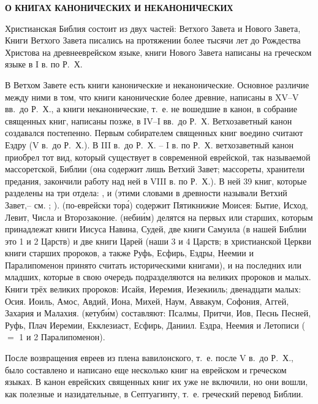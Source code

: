 \thispagestyle{empty}
\begin{center}
\normalsize\bfseries
О КНИГАХ КАНОНИЧЕСКИХ И НЕКАНОНИЧЕСКИХ
\end{center}

Христианская Библия состоит из двух частей: Ветхого Завета и Нового Завета,
Книги Ветхого Завета писались на протяжении более тысячи лет до Рождества
Христова на древнееврейском языке, книги Нового Завета написаны на греческом
языке в I в. по Р.~Х.

В Ветхом Завете есть книги канонические и неканонические.
Основное различие между ними в том, что книги канонические более древние,
написаны в XV--V вв.~до Р.~Х., а книги неканонические, т.~е. не вошедшие в
канон, в собрание священных книг, написаны позже, в IV--I вв.~до Р.~Х.
Ветхозаветный канон создавался постепенно.
Первым собирателем священных книг воедино считают Ездру (V в.~до Р.~Х.).
В III в.~до Р.~Х. -- I в. по Р.~Х. ветхозаветный канон приобрел тот вид,
который существует в современной еврейской, так называемой массоретской,
Библии (она содержит лишь Ветхий Завет; массореты, хранители предания,
закончили работу над ней в VIII в. по Р.~Х.).
В ней 39 книг, которые разделены на три отдела: ,
 и  (этими словами в древности называли
Ветхий Завет,-- см. ; ).
 (по-еврейски тор\'а) содержит Пятикнижие Моисея: Бытие, Исход, Левит,
Числа и Второзаконие.
 (неби\'им) делятся на первых или старших, которым принадлежат книги
Иисуса Навина, Судей, две книги Самуила (в нашей Библии это 1 и 2 Царств) и
две книги Царей (наши 3 и 4 Царств; в христианской Церкви книги старших
пророков, а также Руфь, Есфирь, Ездры, Неемии и Паралипоменон принято
считать историческими книгами), и на последних или младших, которые в
свою очередь подразделяются на великих пророков и малых.
Книги трёх великих пророков: Исайя, Иеремия, Иезекииль;
двенадцати малых: Осия.  Иоиль, Амос, Авдий, Иона, Михей, Наум, Аввакум,
Софония, Аггей, Захария и Малахия.
 (кетуб\'им) составляют: Псалмы, Притчи, Иов, Песнь Песней, Руфь,
Плач Иеремии, Екклезиаст, Есфирь, Даниил. Ездра, Неемия и Летописи
($=$ 1 и 2 Паралипоменон).

После возвращения евреев из плена вавилонского, т.~е. после V в.~до Р.~Х.,
было составлено и написано еще несколько книг на еврейском и греческом языках.
В канон еврейских священных книг их уже не включили, но они вошли, как
полезные и назидательные, в Септуагинту, т.~е. греческий перевод Библии.  


